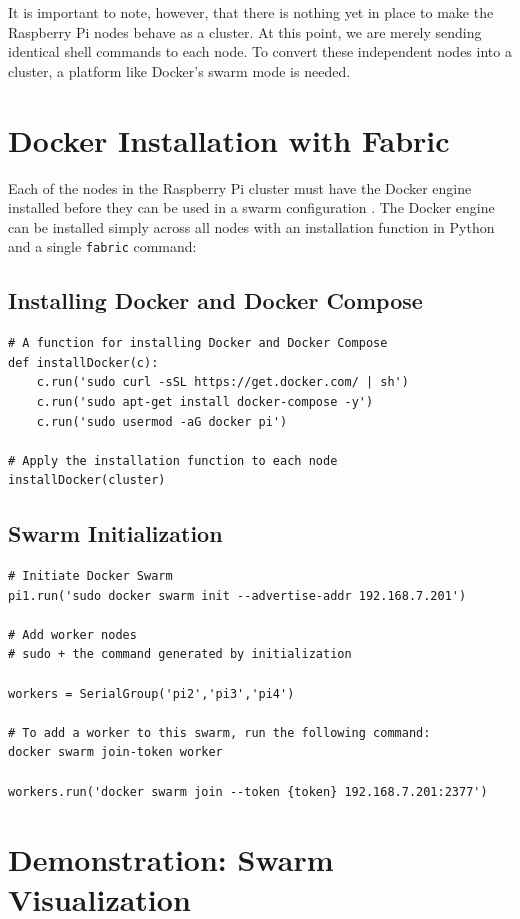 \documentclass[sigconf]{acmart}
\begin{document}
It is important to note, however, that there is nothing yet in place to make the Raspberry Pi nodes behave as a cluster. At 
this point, we are merely sending identical shell commands to each node. To convert these independent nodes into a cluster, 
a platform like Docker's swarm mode is needed.

\section{Docker Installation with Fabric}

Each of the nodes in the Raspberry Pi cluster must have the Docker engine installed before they can be used in a swarm 
configuration \cite{swarmManual2018}. The Docker engine can be installed simply across all nodes with an installation 
function in Python and a single {\tt fabric} command:

\subsection{Installing Docker and Docker Compose}

\begin{lstlisting}
# A function for installing Docker and Docker Compose
def installDocker(c):
    c.run('sudo curl -sSL https://get.docker.com/ | sh')
    c.run('sudo apt-get install docker-compose -y')
    c.run('sudo usermod -aG docker pi')

# Apply the installation function to each node
installDocker(cluster)
\end{lstlisting}

\subsection{Swarm Initialization}

\begin{lstlisting}
# Initiate Docker Swarm
pi1.run('sudo docker swarm init --advertise-addr 192.168.7.201')

# Add worker nodes
# sudo + the command generated by initialization

workers = SerialGroup('pi2','pi3','pi4')

# To add a worker to this swarm, run the following command:
docker swarm join-token worker

workers.run('docker swarm join --token {token} 192.168.7.201:2377')
\end{lstlisting}

\section{Demonstration: Swarm Visualization}
\end{document}
